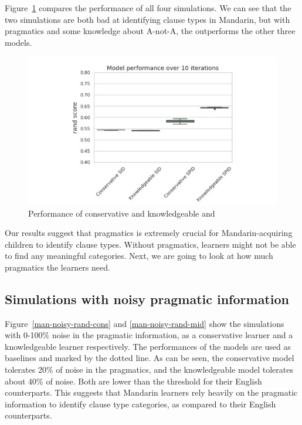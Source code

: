 Figure~\ref{fig:man-rand-compare-mid} compares the performance of all four simulations. We can see that the two \dlearnerabbr{} simulations are both bad at identifying clause types in Mandarin, but with pragmatics and some knowledge about A-not-A, the \plearnerabbr{} outperforms the other three models. 
\begin{figure}[H]
    \centering
    \includegraphics[width=1\textwidth]{figures/man-rand-compare-mid.jpg}
    \caption{Performance of conservative and knowledgeable \dlearnerabbr{} and \plearnerabbr{}}
    \label{fig:man-rand-compare-mid}
\end{figure}

Our results suggest that pragmatics is extremely crucial for Mandarin-acquiring children to identify clause types. Without pragmatics, learners might not be able to find any meaningful categories. Next, we are going to look at how much pragmatics the learners need.

\subsection{Simulations with noisy pragmatic information}
\label{sec:mancl:model:results:noisy}

Figure~\ref{man-noisy-rand-cons} and \ref{man-noisy-rand-mid} show the simulations with 0-100\% noise in the pragmatic information, as a conservative learner and a knowledgeable learner respectively. The performances of the \dlearnerabbr{} models are used as baselines and marked by the dotted line. As can be seen, the conservative \plearnerabbr{} model tolerates 20\% of noise in the pragmatics, and the knowledgeable model tolerates about 40\% of noise. Both are lower than the threshold for their English counterparts. This suggests that Mandarin learners rely heavily on the pragmatic information to identify clause type categories, as compared to their English counterparts. 


